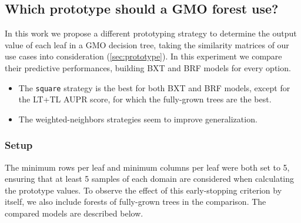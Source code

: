 % 
% 


\subsection{Which prototype should a GMO forest use?}

\label{sec:prototype_comparison}

In this work we propose a different prototyping strategy to determine the output value of each leaf in a GMO decision tree, taking the similarity matrices of our use cases into consideration (\autoref{sec:prototype}).
%
In this experiment we compare their predictive performances, building BXT and BRF models for every option.

\begin{mdframed}[frametitle={Key findings}]
    \begin{itemize}
        \item The \texttt{square} strategy is the best for both BXT and BRF models, except for the LT+TL AUPR score, for which the fully-grown trees are the best.
        \item The weighted-neighbors strategies seem to improve generalization.
    \end{itemize}
\end{mdframed}

\subsubsection{Setup}

The minimum rows per leaf and minimum columns per leaf were both set to 5, ensuring that at least 5 samples of each domain are considered when calculating the prototype values.
%
To observe the effect of this early-stopping criterion by itself, we also include forests of fully-grown trees in the comparison. The compared models are described below.

